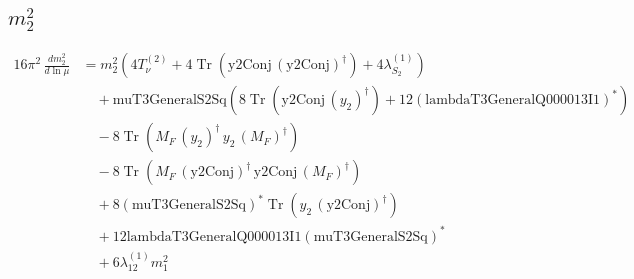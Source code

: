 \documentclass[10pt,a4paper]{article}
\begin{document}
\subsection*{$m_2^2$}
\begin{align*}
16\pi^2\,\frac{d m_2^2}{d\ln\mu} &={m_2^2} (4 T_{\nu}^{(2)}+4 \operatorname{Tr}\!\left(\text{y2Conj}\,\left(\text{y2Conj}\right)^{\dagger}\right)+4 {\lambda_{S_2}^{(1)}}) \\
&\quad +\text{muT3GeneralS2Sq} (8 \operatorname{Tr}\!\left(\text{y2Conj}\,\left({y_2}\right)^{\dagger}\right)+12 \left(\text{lambdaT3GeneralQ000013I1}\right)^{*}) \\
&\quad -8 \operatorname{Tr}\!\left({M_F}\,\left({y_2}\right)^{\dagger}\,{y_2}\,\left({M_F}\right)^{\dagger}\right) \\
&\quad -8 \operatorname{Tr}\!\left({M_F}\,\left(\text{y2Conj}\right)^{\dagger}\,\text{y2Conj}\,\left({M_F}\right)^{\dagger}\right) \\
&\quad +8 \left(\text{muT3GeneralS2Sq}\right)^{*} \operatorname{Tr}\!\left({y_2}\,\left(\text{y2Conj}\right)^{\dagger}\right) \\
&\quad +12 \text{lambdaT3GeneralQ000013I1} \left(\text{muT3GeneralS2Sq}\right)^{*} \\
&\quad +6 {\lambda_{12}^{(1)}} {m_1^2} \\
\end{align*}
\end{document}
